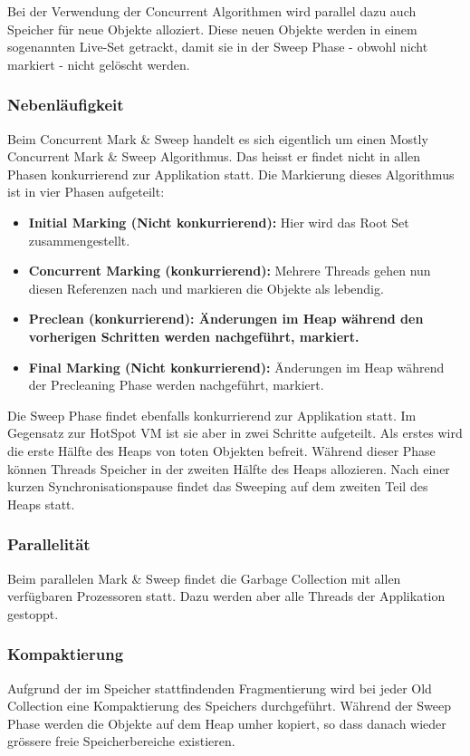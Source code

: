 Bei der Verwendung der Concurrent Algorithmen wird parallel dazu auch Speicher für neue Objekte alloziert. Diese neuen Objekte werden in einem sogenannten Live-Set getrackt, damit sie in der Sweep Phase - obwohl nicht markiert - nicht gelöscht werden.

\subsubsection{Nebenläufigkeit}
Beim Concurrent Mark \& Sweep handelt es sich eigentlich um einen Mostly Concurrent Mark \& Sweep Algorithmus. Das heisst er findet nicht in allen Phasen konkurrierend zur Applikation statt. Die Markierung dieses Algorithmus ist in vier Phasen aufgeteilt:
\begin{itemize}
	\item \textbf{Initial Marking (Nicht konkurrierend):} Hier wird das Root Set zusammengestellt.
	\item \textbf{Concurrent Marking (konkurrierend):} Mehrere Threads gehen nun diesen Referenzen nach und markieren die Objekte als lebendig.
	\item \textbf{Preclean (konkurrierend): Änderungen im Heap während den vorherigen Schritten werden nachgeführt, markiert.}
	\item \textbf{Final Marking (Nicht konkurrierend):} Änderungen im Heap während der Precleaning Phase werden nachgeführt, markiert.
\end{itemize}

Die Sweep Phase findet ebenfalls konkurrierend zur Applikation statt. Im Gegensatz zur HotSpot VM ist sie aber in zwei Schritte aufgeteilt. Als erstes wird die erste Hälfte des Heaps von toten Objekten befreit. Während dieser Phase können Threads Speicher in der zweiten Hälfte des Heaps allozieren. Nach einer kurzen Synchronisationspause findet das Sweeping auf dem zweiten Teil des Heaps statt.

\subsubsection{Parallelität}
Beim parallelen Mark \& Sweep findet die Garbage Collection mit allen verfügbaren Prozessoren statt. Dazu werden aber alle Threads der Applikation gestoppt.

\subsubsection{Kompaktierung}
Aufgrund der im Speicher stattfindenden Fragmentierung wird bei jeder Old Collection eine Kompaktierung des Speichers durchgeführt. Während der Sweep Phase werden die Objekte auf dem Heap umher kopiert, so dass danach wieder grössere freie Speicherbereiche existieren.


